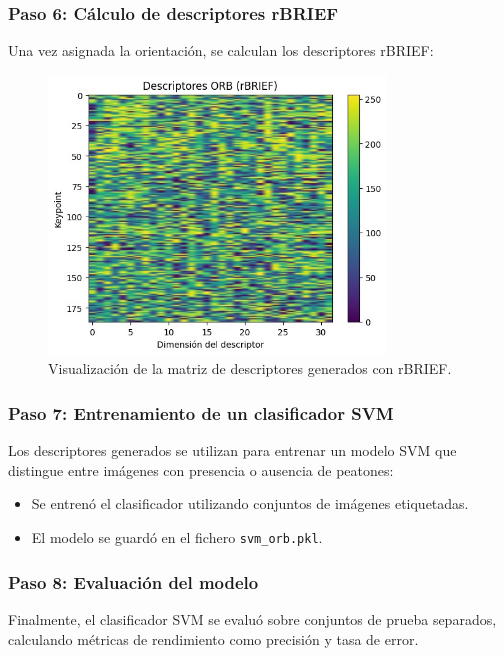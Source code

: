 \documentclass[a4paper]{article}
\begin{document}
\subsubsection*{Paso 6: Cálculo de descriptores rBRIEF}

Una vez asignada la orientación, se calculan los descriptores rBRIEF:

\begin{figure}[H]
    \centering
    \includegraphics[width=0.8\textwidth]{images/rbrief_descriptors.jpg}
    \caption{Visualización de la matriz de descriptores generados con rBRIEF.}
\end{figure}

\subsubsection*{Paso 7: Entrenamiento de un clasificador SVM}

Los descriptores generados se utilizan para entrenar un modelo SVM que distingue entre imágenes con presencia o ausencia de peatones:

\begin{itemize}
    \item Se entrenó el clasificador utilizando conjuntos de imágenes etiquetadas.
    \item El modelo se guardó en el fichero \texttt{svm\_orb.pkl}.
\end{itemize}

\subsubsection*{Paso 8: Evaluación del modelo}

Finalmente, el clasificador SVM se evaluó sobre conjuntos de prueba separados, calculando métricas de rendimiento como precisión y tasa de error.
\end{document}
